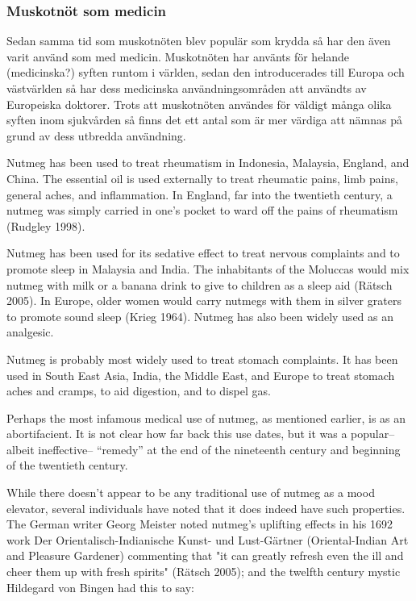 \subsubsection{Muskotnöt som medicin}
Sedan samma tid som muskotnöten blev populär som krydda så har den även
varit använd som med medicin.
Muskotnöten har använts för helande (medicinska?) syften runtom i världen,
sedan den introducerades till Europa och västvärlden så har
dess medicinska användningsområden att användts av Europeiska doktorer.
Trots att muskotnöten användes för väldigt många olika syften inom sjukvården
så finns det ett antal som är mer
värdiga att nämnas på grund av dess utbredda användning.

Nutmeg has been used to treat rheumatism in Indonesia, Malaysia, England, and China. The
essential oil is used externally to treat rheumatic pains, limb pains, general aches, and
inflammation. In England, far into the twentieth century, a nutmeg was simply carried in one's
pocket to ward off the pains of rheumatism (Rudgley 1998).


Nutmeg has been used for its sedative effect to treat nervous complaints and to promote sleep
in Malaysia and India. The inhabitants of the Moluccas would mix nutmeg with milk or a banana
drink to give to children as a sleep aid (Rätsch 2005). In Europe, older women would carry
nutmegs with them in silver graters to promote sound sleep (Krieg 1964). Nutmeg has also
been widely used as an analgesic.


Nutmeg is probably most widely used to treat stomach complaints. It has been used in South
East Asia, India, the Middle East, and Europe to treat stomach aches and cramps, to aid
digestion, and to dispel gas.


Perhaps the most infamous medical use of nutmeg, as mentioned earlier, is as an
abortifacient. It is not clear how far back this use dates, but it was a popular--albeit
ineffective-- “remedy” at the end of the nineteenth century and beginning of the twentieth
century.

While there doesn't appear to be any traditional use of nutmeg as a mood elevator, several
individuals have noted that it does indeed have such properties. The German writer Georg
Meister noted nutmeg's uplifting effects in his 1692 work Der Orientalisch-Indianische Kunst-
und Lust-Gärtner (Oriental-Indian Art and Pleasure Gardener) commenting that "it can greatly
refresh even the ill and cheer them up with fresh spirits" (Rätsch 2005); and the twelfth century
mystic Hildegard von Bingen had this to say:

